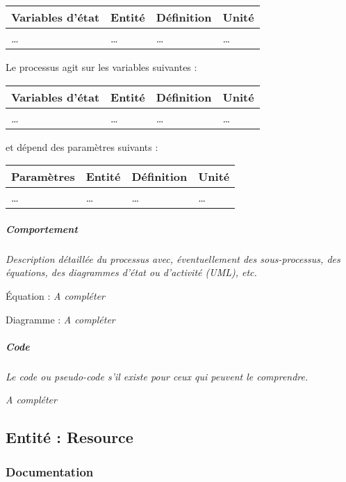 \documentclass[
]{article}
\begin{document}
\begin{longtable}[]{@{}llll@{}}
\toprule\noalign{}
\textbf{Variables d'état} & \textbf{Entité} & \textbf{Définition} &
\textbf{Unité} \\
\midrule\noalign{}
\endhead
\bottomrule\noalign{}
\endlastfoot
\ldots{} & \ldots{} & \ldots{} & \ldots{} \\
\end{longtable}

Le processus agit sur les variables suivantes :

\begin{longtable}[]{@{}llll@{}}
\toprule\noalign{}
\textbf{Variables d'état} & \textbf{Entité} & \textbf{Définition} &
\textbf{Unité} \\
\midrule\noalign{}
\endhead
\bottomrule\noalign{}
\endlastfoot
\ldots{} & \ldots{} & \ldots{} & \ldots{} \\
\end{longtable}

et dépend des paramètres suivants :

\begin{longtable}[]{@{}llll@{}}
\toprule\noalign{}
\textbf{Paramètres} & \textbf{Entité} & \textbf{Définition} &
\textbf{Unité} \\
\midrule\noalign{}
\endhead
\bottomrule\noalign{}
\endlastfoot
\ldots{} & \ldots{} & \ldots{} & \ldots{} \\
\end{longtable}

\subparagraph{Comportement}\label{comportement}

\emph{Description détaillée du processus avec, éventuellement des
sous-processus, des équations, des diagrammes d'état ou d'activité
(UML), etc.}

Équation : \emph{A compléter}

Diagramme : \emph{A compléter}

\subparagraph{Code}\label{code}

\emph{Le code ou pseudo-code s'il existe pour ceux qui peuvent le
comprendre.}

\emph{A compléter}

\subsection{Entité : Resource}\label{entituxe9-resource}

\subsubsection{Documentation}\label{documentation-3}
\end{document}
